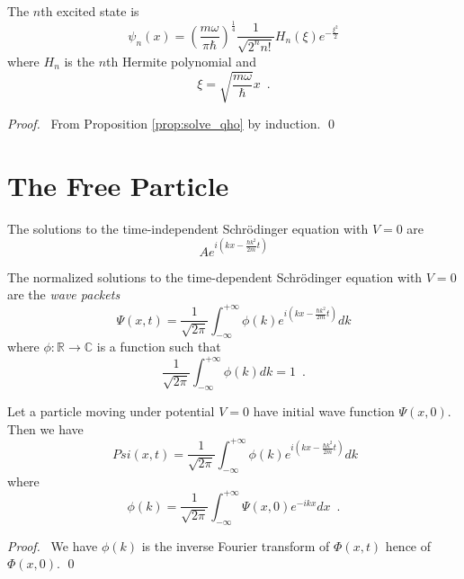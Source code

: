 \begin{prop}
The $n$th excited state is
\[ \psi_n(x) = \left( \frac{m \omega}{\pi \hbar} \right)^{\frac{1}{4}} \frac{1}{\sqrt{2^n n!}} H_n(\xi) e^{-\frac{\xi^2}{2}} \]
where $H_n$ is the $n$th Hermite polynomial and
\[ \xi = \sqrt{\frac{m \omega}{\hbar}} x \enspace . \]
\end{prop}

\begin{proof}
\pf\ From Proposition \ref{prop:solve_qho} by induction. \qed
\end{proof}

\section{The Free Particle}

\begin{prop}
The solutions to the time-independent Schr\"{o}dinger equation with $V = 0$ are 
\[ A e^{i(kx - \frac{\hbar k^2}{2m} t)} \]
\end{prop}

\begin{prop}
The normalized solutions to the time-dependent Schr\"{o}dinger equation with $V = 0$ are the \emph{wave packets}
\[ \Psi(x,t) = \frac{1}{\sqrt{2\pi}} \int_{- \infty}^{+ \infty} \phi(k) e^{i(kx - \frac{\hbar k^2}{2m}t)} dk \]
where $\phi : \mathbb{R} \rightarrow \mathbb{C}$ is a function such that
\[ \frac{1}{\sqrt{2 \pi}} \int_{-\infty}^{+ \infty} \phi(k) dk = 1 \enspace . \]
\end{prop}

\begin{prop}
Let a particle moving under potential $V = 0$ have initial wave function $\Psi(x,0)$. Then we have
\[\ Psi(x,t) = \frac{1}{\sqrt{2\pi}} \int_{- \infty}^{+ \infty} \phi(k) e^{i(kx - \frac{\hbar k^2}{2m}t)} dk \]
where
\[ \phi(k) = \frac{1}{\sqrt{2 \pi}} \int_{- \infty}^{+ \infty} \Psi(x,0) e^{-ikx} dx \enspace . \]
\end{prop}

\begin{proof}
\pf\ We have $\phi(k)$ is the inverse Fourier transform of $\Phi(x,t)$ hence of $\Phi(x,0)$. \qed
\end{proof}